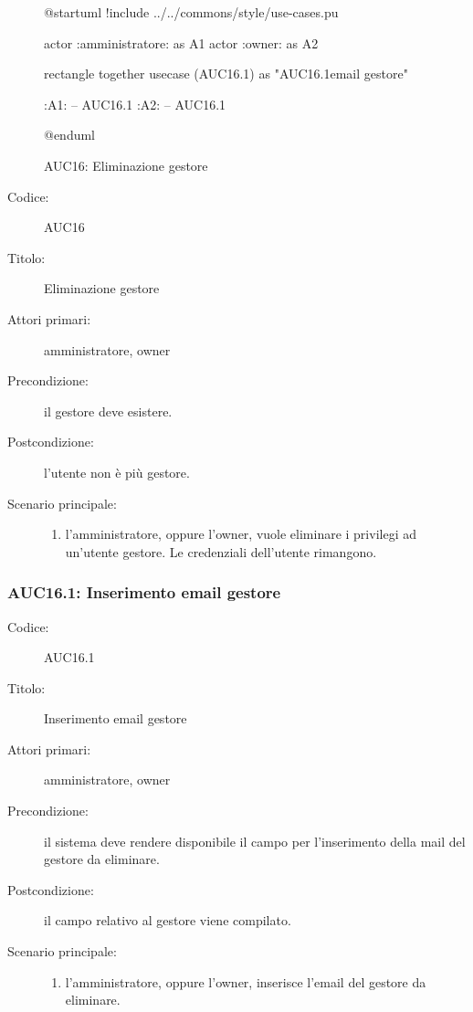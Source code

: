 \documentclass[../../../analisi-dei-requisiti.tex]{subfiles}
\begin{document}
\begin{figure}[H]
  \centering
  \begin{plantuml}
  @startuml
  !include ../../commons/style/use-cases.pu

  actor :amministratore: as A1
  actor :owner: as A2


  rectangle {
    together {
      usecase (AUC16.1) as "AUC16.1\nInserimento email gestore"
    }
  }

  :A1: -- AUC16.1
  :A2: -- AUC16.1

  @enduml
  \end{plantuml}
  \caption{AUC16: Eliminazione gestore}%
  \label{fig:auc16}
\end{figure}

\begin{description}
  \item[Codice:] AUC16
  \item[Titolo:] Eliminazione gestore
  \item[Attori primari:] amministratore, owner
  \item[Precondizione:] il gestore deve esistere.
  \item[Postcondizione:] l'utente non è più gestore.
  \item[Scenario principale:]
  \begin{enumerate}
    \item l'amministratore, oppure l'owner, vuole eliminare i privilegi ad un'utente gestore. Le credenziali dell'utente rimangono.
  \end{enumerate}
\end{description}

\subsubsection{AUC16.1: Inserimento email gestore}%
\label{subs:AUC16.1}
\begin{description}
  \item[Codice:] AUC16.1
  \item[Titolo:] Inserimento email gestore
  \item[Attori primari:] amministratore, owner
  \item[Precondizione:] il sistema deve rendere disponibile il campo per l'inserimento della mail del gestore da eliminare.
  \item[Postcondizione:] il campo relativo al gestore viene compilato.
  \item[Scenario principale:]
  \begin{enumerate}
    \item l'amministratore, oppure l'owner, inserisce l'email del gestore da eliminare.
  \end{enumerate}
\end{description}
\end{document}
